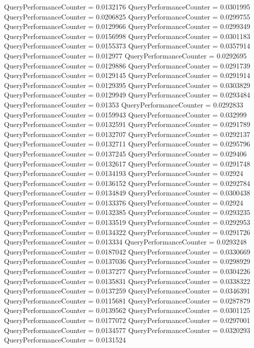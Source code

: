 \documentclass[9pt]{article}
\theoremstyle{plain}
\theoremstyle{definition}
\theoremstyle{remark}
\numberwithin{equation}{section}
\begin{document}
QueryPerformanceCounter  =  0.0132176
QueryPerformanceCounter  =  0.0301995
QueryPerformanceCounter  =  0.0206825
QueryPerformanceCounter  =  0.0299755
QueryPerformanceCounter  =  0.0129966
QueryPerformanceCounter  =  0.0299349
QueryPerformanceCounter  =  0.0156998
QueryPerformanceCounter  =  0.0301183
QueryPerformanceCounter  =  0.0155373
QueryPerformanceCounter  =  0.0357914
QueryPerformanceCounter  =  0.012977
QueryPerformanceCounter  =  0.0292695
QueryPerformanceCounter  =  0.0129886
QueryPerformanceCounter  =  0.0291739
QueryPerformanceCounter  =  0.0129145
QueryPerformanceCounter  =  0.0291914
QueryPerformanceCounter  =  0.0129395
QueryPerformanceCounter  =  0.0303829
QueryPerformanceCounter  =  0.0129949
QueryPerformanceCounter  =  0.0293484
QueryPerformanceCounter  =  0.01353
QueryPerformanceCounter  =  0.0292833
QueryPerformanceCounter  =  0.0159943
QueryPerformanceCounter  =  0.032999
QueryPerformanceCounter  =  0.0132591
QueryPerformanceCounter  =  0.0291789
QueryPerformanceCounter  =  0.0132707
QueryPerformanceCounter  =  0.0292137
QueryPerformanceCounter  =  0.0132711
QueryPerformanceCounter  =  0.0295796
QueryPerformanceCounter  =  0.0137245
QueryPerformanceCounter  =  0.029406
QueryPerformanceCounter  =  0.0132617
QueryPerformanceCounter  =  0.0291748
QueryPerformanceCounter  =  0.0134193
QueryPerformanceCounter  =  0.02924
QueryPerformanceCounter  =  0.0136152
QueryPerformanceCounter  =  0.0292784
QueryPerformanceCounter  =  0.0134849
QueryPerformanceCounter  =  0.0300438
QueryPerformanceCounter  =  0.0133376
QueryPerformanceCounter  =  0.02924
QueryPerformanceCounter  =  0.0132385
QueryPerformanceCounter  =  0.0293235
QueryPerformanceCounter  =  0.0133519
QueryPerformanceCounter  =  0.0292953
QueryPerformanceCounter  =  0.0134322
QueryPerformanceCounter  =  0.0291726
QueryPerformanceCounter  =  0.013334
QueryPerformanceCounter  =  0.0293248
QueryPerformanceCounter  =  0.0187042
QueryPerformanceCounter  =  0.0330669
QueryPerformanceCounter  =  0.0137036
QueryPerformanceCounter  =  0.0298929
QueryPerformanceCounter  =  0.0137277
QueryPerformanceCounter  =  0.0304226
QueryPerformanceCounter  =  0.0135831
QueryPerformanceCounter  =  0.0338322
QueryPerformanceCounter  =  0.0137259
QueryPerformanceCounter  =  0.0346391
QueryPerformanceCounter  =  0.0115681
QueryPerformanceCounter  =  0.0287879
QueryPerformanceCounter  =  0.0139562
QueryPerformanceCounter  =  0.0301125
QueryPerformanceCounter  =  0.0177072
QueryPerformanceCounter  =  0.0297001
QueryPerformanceCounter  =  0.0134577
QueryPerformanceCounter  =  0.0320293
QueryPerformanceCounter  =  0.0131524
\end{document}
